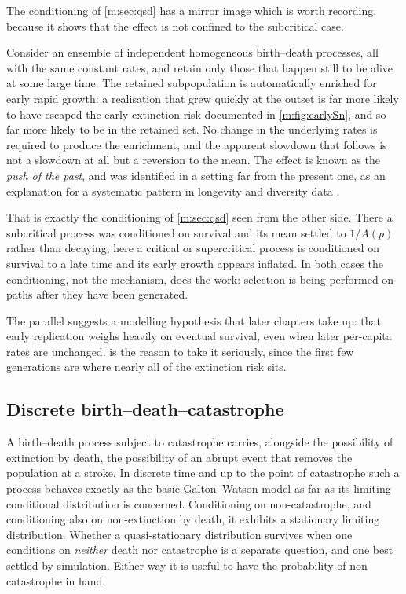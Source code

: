 The conditioning of \cref{m:sec:qsd} has a mirror image which is worth recording,
because it shows that the effect is not confined to the subcritical case.

Consider an ensemble of independent homogeneous birth--death processes, all with
the same constant rates, and retain only those that happen still to be alive at
some large time. The retained subpopulation is automatically enriched for early
rapid growth: a realisation that grew quickly at the outset is far more likely to
have escaped the early extinction risk documented in \cref{m:fig:earlySn}, and so
far more likely to be in the retained set. No change in the underlying rates is
required to produce the enrichment, and the apparent slowdown that follows is not a
slowdown at all but a reversion to the mean. The effect is known as the \emph{push
of the past}, and was identified in a setting far from the present one, as an
explanation for a systematic pattern in longevity and diversity data
\cite{Budd2018}.

That is exactly the conditioning of \cref{m:sec:qsd} seen from the other side. There
a subcritical process was conditioned on survival and its mean settled to $1/A(p)$
rather than decaying; here a critical or supercritical process is conditioned on
survival to a late time and its early growth appears inflated. In both cases the
conditioning, not the mechanism, does the work: selection is being performed on
paths after they have been generated.

The parallel suggests a modelling hypothesis that later chapters take up: that
early replication weighs heavily on eventual survival, even when later per-capita
rates are unchanged.  is the reason to take it seriously, since
the first few generations are where nearly all of the extinction risk sits.

\subsection{Discrete birth--death--catastrophe}
\label{m:sec:bdc}

A birth--death process subject to catastrophe carries, alongside the possibility of
extinction by death, the possibility of an abrupt event that removes the population
at a stroke. In discrete time and up to the point of catastrophe such a process
behaves exactly as the basic Galton--Watson model as far as its limiting
conditional distribution is concerned. Conditioning on non-catastrophe, and
conditioning also on non-extinction by death, it exhibits a stationary limiting
distribution. Whether a quasi-stationary distribution survives when one conditions
on \emph{neither} death nor catastrophe is a separate question, and one best
settled by simulation. Either way it is useful to have the probability of
non-catastrophe in hand.

